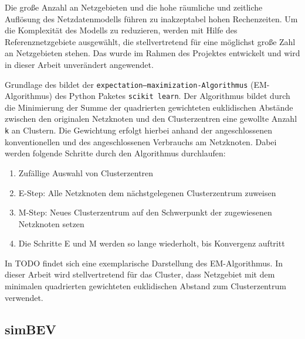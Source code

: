 Die große Anzahl an Netzgebieten und die hohe räumliche und zeitliche Auflösung des Netzdatenmodells führen zu inakzeptabel hohen Rechenzeiten.
Um die Komplexität des Modells zu reduzieren, werden mit Hilfe des \kmeans Referenznetzgebiete ausgewählt, die stellvertretend für eine möglichst große Zahl an Netzgebieten stehen.
Das \kmeans wurde im Rahmen des \openego Projektes entwickelt und wird in dieser Arbeit unverändert angewendet. \cite{Mueller2019}\medskip

Grundlage des \kmeans bildet der \texttt{expectation–maximization-Algorithmus} (EM-Algorithmus) des Python Paketes \texttt{scikit learn}. \cite{scikit-learn2011}
Der Algorithmus bildet durch die Minimierung der Summe der quadrierten gewichteten euklidischen Abstände zwischen den originalen Netzknoten und den Clusterzentren eine gewollte Anzahl \texttt{k} an Clustern.
Die Gewichtung erfolgt hierbei anhand der angeschlossenen konventionellen und des angeschlossenen Verbrauchs am Netzknoten.
Dabei werden folgende Schritte durch den Algorithmus durchlaufen:

\begin{enumerate}
	\item Zufällige Auswahl von Clusterzentren
	\item E-Step: Alle Netzknoten dem nächstgelegenen Clusterzentrum zuweisen
	\item M-Step: Neues Clusterzentrum auf den Schwerpunkt der zugewiesenen Netzknoten setzen
	\item Die Schritte E und M werden so lange wiederholt, bis Konvergenz auftritt
\end{enumerate}


In {\color{red} TODO} findet sich eine exemplarische Darstellung des EM-Algorithmus.
In dieser Arbeit wird stellvertretend für das Cluster, dass Netzgebiet mit dem minimalen quadrierten gewichteten euklidischen Abstand zum Clusterzentrum verwendet.


\subsection{simBEV}\label{chap:simbev_theo}


